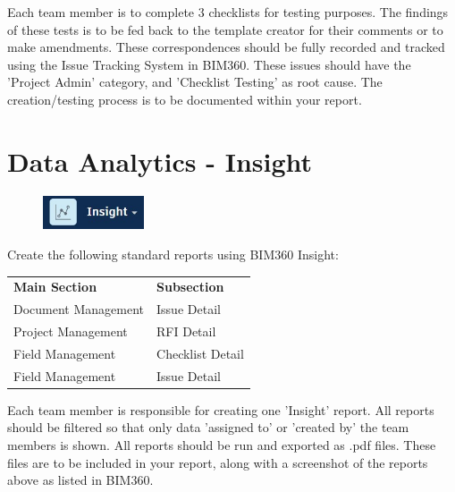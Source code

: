 Each team member is to complete 3 checklists for testing purposes.  The findings of these tests is to be fed back to the template creator for their comments or to make amendments.  These correspondences should be fully recorded and tracked using the Issue Tracking System in BIM360. These issues should have the 'Project Admin' category, and 'Checklist Testing' as root cause.  The creation/testing process is to be documented within your report.  



\section{Data Analytics - Insight}

\begin{figure}[h!t]
	\includegraphics[height=1.0cm]{RevitAssets/insight}
	\label{fig:insight}
\end{figure}




Create the following standard reports using BIM360 Insight: 

\begin{table}[h!]
	\begin{center}
		\begin{tabular}{p{5cm}  p{5cm} }
			\toprule
			\textbf{Main Section} & \textbf{Subsection} \\ 
			\cmidrule(r){1-1}\cmidrule(lr){2-2}
			Document Management & Issue Detail \\
			Project Management & RFI Detail \\
			Field Management & Checklist Detail \\
			Field Management & Issue Detail \\
			\bottomrule
		\end{tabular}
		\label{tbl:markSchemeAsmt2}
	\end{center}
\end{table}


Each team member is responsible for creating one 'Insight' report.  All reports should be filtered so that only data 'assigned to' or 'created by' the team members is shown.  All reports should be run and exported as .pdf files.  These files are to be included in your report, along with a screenshot of the reports above as listed in BIM360.\\



